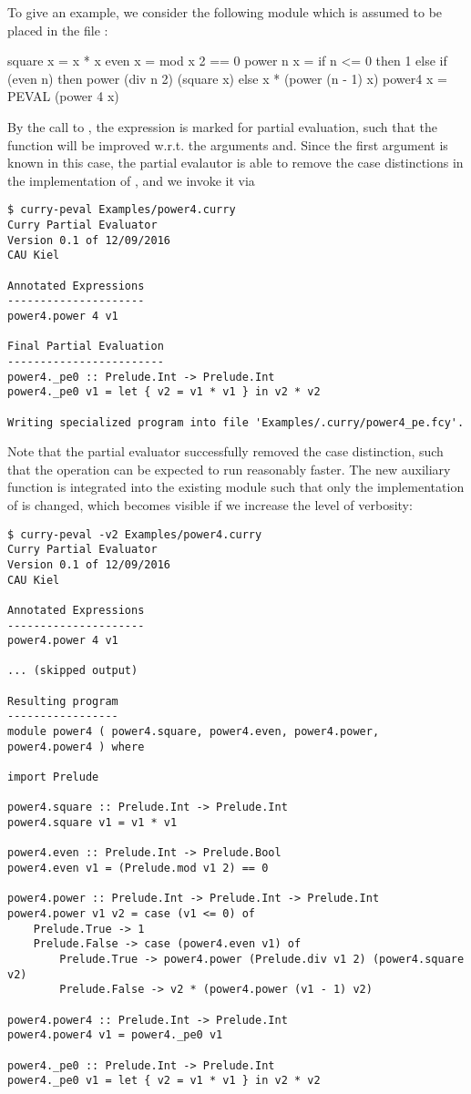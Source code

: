 To give an example, we consider the following module which is assumed
to be placed in the file :
\begin{curry}
square  x = x * x
even    x = mod x 2 == 0
power n x = if n <= 0 then 1
                      else if (even n) then power (div n 2) (square x)
                                       else x * (power (n - 1) x)
power4  x = PEVAL (power 4 x)
\end{curry}
By the call to , the expression 
is marked for partial evaluation, such that the function 
will be improved w.r.t. the arguments  and.
Since the first argument is known in this case,
the partial evalautor is able to remove the case distinctions
in the implementation of , and we invoke it via
\begin{lstlisting}[mathescape=false]
$ curry-peval Examples/power4.curry
Curry Partial Evaluator
Version 0.1 of 12/09/2016
CAU Kiel

Annotated Expressions
---------------------
power4.power 4 v1

Final Partial Evaluation
------------------------
power4._pe0 :: Prelude.Int -> Prelude.Int
power4._pe0 v1 = let { v2 = v1 * v1 } in v2 * v2

Writing specialized program into file 'Examples/.curry/power4_pe.fcy'.
\end{lstlisting}

Note that the partial evaluator successfully removed the case distinction,
such that the operation  can be expected to run reasonably faster.
The new auxiliary function  is integrated into the
existing module such that only the implementation of  is changed,
which becomes visible if we increase the level of verbosity:
\begin{lstlisting}[mathescape=false]
$ curry-peval -v2 Examples/power4.curry
Curry Partial Evaluator
Version 0.1 of 12/09/2016
CAU Kiel

Annotated Expressions
---------------------
power4.power 4 v1

... (skipped output)

Resulting program
-----------------
module power4 ( power4.square, power4.even, power4.power, power4.power4 ) where

import Prelude

power4.square :: Prelude.Int -> Prelude.Int
power4.square v1 = v1 * v1

power4.even :: Prelude.Int -> Prelude.Bool
power4.even v1 = (Prelude.mod v1 2) == 0

power4.power :: Prelude.Int -> Prelude.Int -> Prelude.Int
power4.power v1 v2 = case (v1 <= 0) of
    Prelude.True -> 1
    Prelude.False -> case (power4.even v1) of
        Prelude.True -> power4.power (Prelude.div v1 2) (power4.square v2)
        Prelude.False -> v2 * (power4.power (v1 - 1) v2)

power4.power4 :: Prelude.Int -> Prelude.Int
power4.power4 v1 = power4._pe0 v1

power4._pe0 :: Prelude.Int -> Prelude.Int
power4._pe0 v1 = let { v2 = v1 * v1 } in v2 * v2
\end{lstlisting}

